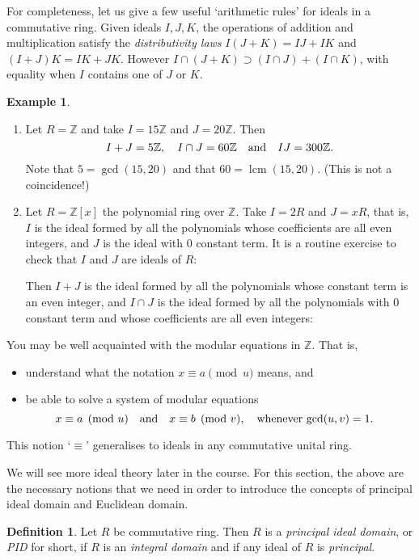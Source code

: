 \documentclass[12pt]{article}
\newcommand{\qbox}[1]{\quad\hbox{#1}\quad}
\theoremstyle{definition}
\newtheorem{defn}[thm]{Definition}
\newtheorem{example}[thm]{Example}
\newcounter{ex}\renewcommand\theex{\arabic{ex}}
\newcommand{\Z}{\ensuremath{\mathbb{Z}}}
\newcommand{\lcm}{\ensuremath{\operatorname{lcm}}}
\begin{document}
For completeness, let us give a few useful `arithmetic rules' for
ideals in a commutative ring.
Given ideals $I,J,K$, the
operations of addition and multiplication satisfy the {\em
distributivity laws}
$I(J+K)=IJ+IK$ and $(I+J)K=IK+JK$. However
$I\cap(J+K)\supset(I\cap J)+(I\cap K)$, with equality when $I$
contains one of $J$ or $K$.

\begin{example}\label{ex:ideals}
\begin{enumerate}\item
Let $R=\Z$ and take
$I=15\Z$ and $J=20\Z$. Then
$$I+J=5\Z,\quad I\cap J=60\Z\qbox{and}IJ=300\Z.$$
Note that $5=\gcd(15,20)$ and that $60=\lcm(15,20)$. (This is not a
coincidence!)
\item Let $R=\Z[x]$ the polynomial ring over $\Z$. Take
$I=2R$ and $J=xR$, that is, $I$ is the ideal formed by all the
polynomials whose coefficients are all even integers, and $J$ is the
ideal with $0$ constant term. It is a routine exercise to check that
$I$ and $J$ are ideals of $R$:

\vspace{2.5cm}
Then $I+J$ is the ideal formed by all the polynomials whose constant
term is an even integer, and $I\cap J$ is the ideal formed by all the
polynomials with $0$ constant term and whose coefficients are all even
integers:
\vspace{2.5cm}

\end{enumerate}
\end{example}

You may be well acquainted with the modular equations in $\Z$. That
is,
\begin{itemize}
\item understand what the notation $x\equiv a\pmod u$ means, and
\item be able to solve a system of modular equations
$$x\equiv a\pmod u\qbox{and}x\equiv b\pmod v,\qbox{whenever $\gcd(u,v)=1$.}$$
\end{itemize}
This notion `$\equiv$' generalises to ideals in any commutative unital
ring.


We will see more ideal theory later in the course. For this section,
the above are the necessary notions that we need in order to introduce
the concepts of principal ideal domain and Euclidean domain. 


\begin{defn}\label{def:pid}
Let $R$ be commutative ring. Then $R$ is a
{\em principal ideal domain}, or {\em PID} for short, if $R$ is an
{\em integral domain} and if any ideal of
$R$ is {\em principal}.
\end{defn}
\end{document}

